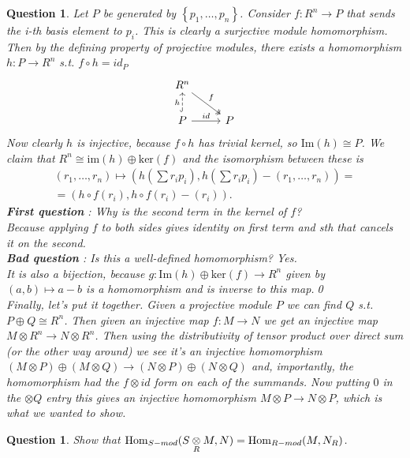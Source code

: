 \documentclass[a4paper]{article}
\newtheorem{que}[thm]{Question}
\begin{document}
\begin{que}
    Let  $P$ be generated by  $\left\{ p_1, \ldots, p_n \right\} $. Consider $f:R^{n}\to P$ that sends the i-th basis element to $p_i$. This is clearly a surjective module homomorphism. Then by the defining property of projective modules, there exists a homomorphism  $h:P\to R^{n}$ s.t. $f\circ h=id_P$
    \[
    \begin{tikzcd}
        R^{n}\arrow[rd,two heads,"f"]\\
        P\arrow[r,"id"]\arrow[u,dashed,hook,"h"] & P
    \end{tikzcd}
   \] 
   Now clearly $h$ is injective, because $f\circ h$ has trivial kernel, so  $\text{Im}(h) \cong P$. We claim that  $R^{n}\cong \text{im}\left( h \right) \oplus \text{ker}\left( f \right) $ and the isomorphism between these is \begin{align*}
       \left( r_1, \ldots, r_n \right)\mapsto \left( h\left( \sum r_i p_i \right),h\left( \sum r_i p_i \right)- \left( r_1, \ldots, r_n \right)  \right)=\\ =\left( h\circ f\left( r_i\right), h\circ f\left( r_i \right)-\left( r_i \right)    \right) 
   .
   \end{align*}
   \textbf{First question} : Why is the second term in the kernel of $f$? \\Because applying $f$ to both sides gives identity on first term and sth that cancels it on the second.\\
   \textbf{Bad question} : Is this a well-defined homomorphism? Yes.\\
   It is also a bijection, because $g : \text{Im}(h) \oplus \text{ker}(f) \to R^n$ given by $(a,b) \mapsto 
   a-b$ is a homomorphism and is inverse to this map.\qed \\
Finally, let's put it together. Given a projective module $P$ we can find $Q$ s.t. $P\oplus Q\cong R^{n}$. Then given an injective map $f:M\to N$ we get an injective map $M\otimes R^{n}\to N\otimes R^{n}$. Then using the distributivity of tensor product over direct sum (or the other way around) we see it's an injective homomorphism $\left( M\otimes P \right) \oplus \left( M\otimes Q \right) \to \left( N\otimes P \right) \oplus \left( N\otimes Q \right) $ and, importantly, the homomorphism had the $f\otimes id$ form on each of the summands. Now putting $0$ in the $\otimes Q$ entry this gives an injective homomorphism $M\otimes P\to N\otimes P$, which is what we wanted to show.
\end{que}
\begin{que} Show that $\operatorname{Hom}_{S-mod}(S \mathbin{\mathop{\otimes}\limits_{R}} M, N) = \operatorname{Hom}_{R-mod}(M, N_R)$.
\end{que}
\end{document}
